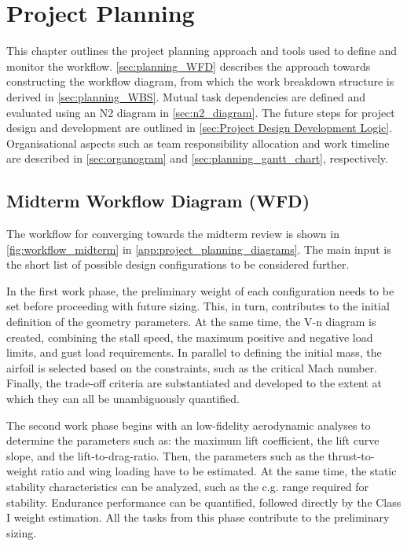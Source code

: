 \chapter{Project Planning}
\label{ch:planning}

This chapter outlines the project planning approach and tools used to define and monitor the workflow. \autoref{sec:planning_WFD} describes the approach towards constructing the workflow diagram, from which the work breakdown structure is derived in \autoref{sec:planning_WBS}. Mutual task dependencies are defined and evaluated using an N2 diagram in \autoref{sec:n2_diagram}. The future steps for project design and development are outlined in \autoref{sec:Project Design Development Logic}. Organisational aspects such as team responsibility allocation and work timeline are described in \autoref{sec:organogram} and \autoref{sec:planning_gantt_chart}, respectively.
\section{Midterm Workflow Diagram (WFD)}
\label{sec:planning_WFD}

The workflow for converging towards the midterm review is shown in \autoref{fig:workflow_midterm} in \autoref{app:project_planning_diagrams}. The main input is the short list of possible design configurations to be considered further. 

In the first work phase, the preliminary weight of each configuration needs to be set before proceeding with future sizing. This, in turn, contributes to the initial definition of the geometry parameters. At the same time, the V-n diagram is created, combining the stall speed, the maximum positive and negative load limits, and gust load requirements. In parallel to defining the initial mass, the airfoil is selected based on the constraints, such as the critical Mach number. Finally, the trade-off criteria are substantiated and developed to the extent at which they can all be unambiguously quantified.

The second work phase begins with an low-fidelity aerodynamic analyses to determine the parameters such as: the maximum lift coefficient, the lift curve slope, and the lift-to-drag-ratio. Then, the parameters such as the thrust-to-weight ratio and wing loading have to be estimated. At the same time, the static stability characteristics can be analyzed, such as the c.g. range required for stability. Endurance performance can be quantified, followed directly by the Class I weight estimation. %
All the tasks from this phase contribute to the preliminary sizing.

